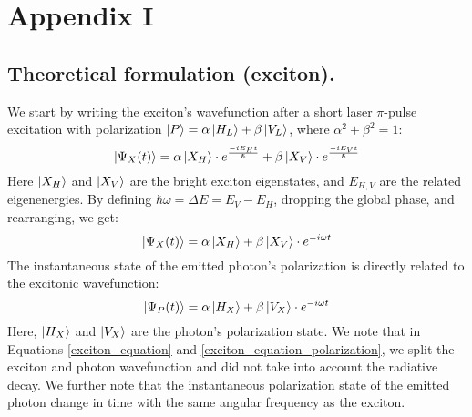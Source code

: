 \section{Appendix I}\label{appendix1}
\subsection*{Theoretical formulation (exciton).}
We start by writing the exciton's wavefunction after a short laser $\pi$-pulse excitation with polarization $\ket{P}=\alpha\ket{H_L}+\beta\ket{V_L}$, where $\alpha^2+\beta^2=1$:
\begin{equation}
	\ket{\Psi_X(t)} = \alpha\ket{X_H}\cdot e^{\frac{-iE_H t}{\hslash}}+\beta\ket{X_V}\cdot e^{\frac{-iE_Vt}{\hslash}}
\end{equation}
Here $\ket{X_H}$ and $\ket{X_V}$ are the bright exciton eigenstates, and $E_{H,V}$ are the related eigenenergies.
By defining $\hbar\omega=\Delta E=E_V-E_H$, dropping the global phase, and rearranging, we get:
\begin{equation}\label{exciton_equation}
	\ket{\Psi_X(t)} = \alpha\ket{X_H} + \beta\ket{X_V}\cdot e^{-i\omega t}
\end{equation}
The instantaneous state of the emitted photon's polarization is directly related to the excitonic wavefunction\cite{Varo2022}:
\begin{equation}\label{exciton_equation_polarization}
	\ket{\Psi_P(t)} = \alpha\ket{H_X}+\beta\ket{V_X}\cdot e^{-i\omega t}
\end{equation}
Here, $\ket{H_X}$ and $\ket{V_X}$ are the photon's polarization state.
We note that in Equations \ref{exciton_equation} and \ref{exciton_equation_polarization}, we split the exciton and photon wavefunction and did not take into account the radiative decay.
We further note that the instantaneous polarization state of the emitted photon change in time with the same angular frequency as the exciton.
